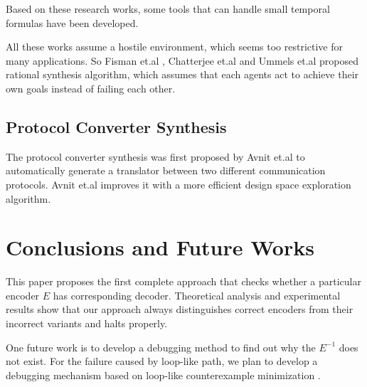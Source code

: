 \documentclass[journal]{IEEEtran}
\begin{document}
Based on these research works,
some tools\cite{ANZU} that can handle small temporal formulas have been developed.

All these works assume a hostile environment,
which seems too restrictive for many applications.
So Fisman et.al \cite{rationalsyn_tacas10}, Chatterjee et.al \cite{assguasyn_tacas07} and Ummels et.al \cite{ralgame_istta06} proposed rational synthesis algorithm,
which assumes that each agents act to achieve their own goals instead of failing each other.


\subsection{Protocol Converter Synthesis}
The protocol converter synthesis was first proposed by Avnit et.al \cite{converter_date08} to automatically generate a translator between two different communication protocols.
Avnit et.al\cite{converter_date09} improves it with a more efficient design space exploration algorithm.


\section{Conclusions and Future Works}\label{sec_conclude}

This paper proposes the first complete approach that checks whether a particular encoder $E$ has corresponding decoder.
Theoretical analysis and experimental results show that our approach always distinguishes correct encoders from their incorrect variants and halts properly.

One future work is to develop a debugging method to find out why the $E^{-1}$ does not exist.
For the failure caused by loop-like path,
we plan to develop a debugging mechanism based on loop-like counterexample minimization \cite{ShengYuShen:charme05}.



%
%
\end{document}
